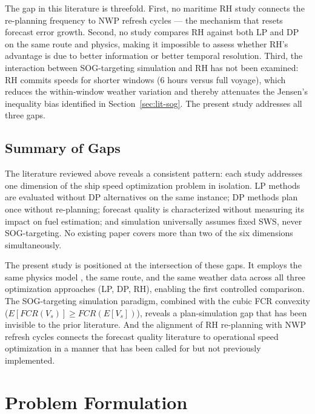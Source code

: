 \documentclass[review]{elsarticle}
\begin{document}
The gap in this literature is threefold. First, no maritime RH study connects the re-planning frequency to NWP refresh cycles --- the mechanism that resets forecast error growth. Second, no study compares RH against both LP and DP on the same route and physics, making it impossible to assess whether RH's advantage is due to better information or better temporal resolution. Third, the interaction between SOG-targeting simulation and RH has not been examined: RH commits speeds for shorter windows (6 hours versus full voyage), which reduces the within-window weather variation and thereby attenuates the Jensen's inequality bias identified in Section~\ref{sec:lit-sog}. The present study addresses all three gaps.

\subsection{Summary of Gaps}
\label{sec:lit-gaps}


The literature reviewed above reveals a consistent pattern: each study addresses one dimension of the ship speed optimization problem in isolation. LP methods are evaluated without DP alternatives on the same instance; DP methods plan once without re-planning; forecast quality is characterized without measuring its impact on fuel estimation; and simulation universally assumes fixed SWS, never SOG-targeting. No existing paper covers more than two of the six dimensions simultaneously.

The present study is positioned at the intersection of these gaps. It employs the same physics model \cite{Yang2020}, the same route, and the same weather data across all three optimization approaches (LP, DP, RH), enabling the first controlled comparison. The SOG-targeting simulation paradigm, combined with the cubic FCR convexity ($E[FCR(V_s)] \geq FCR(E[V_s])$), reveals a plan-simulation gap that has been invisible to the prior literature. And the alignment of RH re-planning with NWP refresh cycles connects the forecast quality literature to operational speed optimization in a manner that has been called for \cite{Yang2020,Luo2023} but not previously implemented.


\section{Problem Formulation}
\label{sec:problem}
\end{document}
